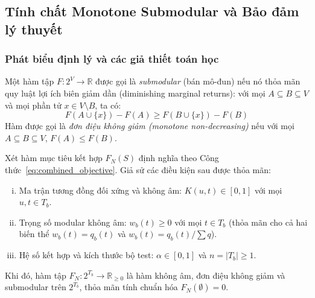 \subsection{Tính chất Monotone Submodular và Bảo đảm lý thuyết}
\label{subsec:submodular_properties}

\subsubsection{Phát biểu định lý và các giả thiết toán học}
\label{subsubsec:theorem_statement}

Một hàm tập $F: 2^V \to \mathbb{R}$ được gọi là \textit{submodular} (bán mô-đun) nếu nó thỏa mãn quy luật lợi ích biên giảm dần (diminishing marginal returns): với mọi $A \subseteq B \subseteq V$ và mọi phần tử $x \in V \setminus B$, ta có:
\begin{equation}
F(A \cup \{x\}) - F(A) \ge F(B \cup \{x\}) - F(B)
\end{equation}
Hàm được gọi là \textit{đơn điệu không giảm (monotone non-decreasing)} nếu với mọi $A \subseteq B \subseteq V$, $F(A) \le F(B)$.

\begin{dl}
\label{dl:submodular_v1}
Xét hàm mục tiêu kết hợp $F_N(S)$ định nghĩa theo Công thức~\eqref{eq:combined_objective}. Giả sử các điều kiện sau được thỏa mãn:
\begin{enumerate}[(i)]
    \item Ma trận tương đồng đối xứng và không âm: $K(u, t) \in [0, 1]$ với mọi $u, t \in T_b$.
    \item Trọng số modular không âm: $w_b(t) \ge 0$ với mọi $t \in T_b$ (thỏa mãn cho cả hai biến thể $w_b(t) = q_b(t)$ và $w_b(t) = q_b(t) / \sum q$).
    \item Hệ số kết hợp và kích thước bộ test: $\alpha \in [0, 1]$ và $n = |T_b| \ge 1$.
\end{enumerate}
Khi đó, hàm tập $F_N: 2^{T_b} \to \mathbb{R}_{\ge 0}$ là hàm không âm, đơn điệu không giảm và submodular trên $2^{T_b}$, thỏa mãn tính chuẩn hóa $F_N(\emptyset) = 0$.
\end{dl}

